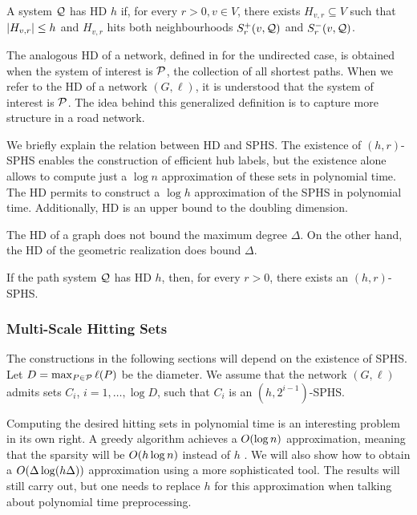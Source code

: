 \begin{definition}
A system $\mathcal{Q}$ has HD $h$ if, for every $r>0, v\in V$, there exists $H_{v,r}\subseteq V$ such that $\lvert H_{v,r}\rvert\leq h$ and $H_{v,r}$ hits both neighbourhoods $S_r^+(v,\mathcal{Q})$ and $S_r^-(v,\mathcal{Q})$.
\end{definition}

The analogous HD of a network, defined in \citet{highway2013} for the undirected case, is obtained when the system of interest is $\mathcal{P}$, the collection of all shortest paths.
When we refer to the HD of a network $(G,\ell)$, it is understood that the system of interest is $\mathcal{P}$.
The idea behind this generalized definition is to capture more structure in a road network.

We briefly explain the relation between HD and SPHS.
The existence of $(h,r)$-SPHS enables the construction of efficient hub labels, but the existence alone allows to compute just a $\log n$ approximation of these sets in polynomial time.
The HD permits to construct a $\log h$ approximation of the SPHS in polynomial time.
Additionally, HD is an upper bound to the doubling dimension.

The HD of a graph does not bound the maximum degree $\Delta$.
On the other hand, the HD of the geometric realization does bound $\Delta$.

\begin{proposition}
If the path system $\mathcal{Q}$ has HD $h$, then, for every $r>0$, there exists an $(h,r)$-SPHS.
\end{proposition}

\subsubsection{Multi-Scale Hitting Sets} \label{sec:multi_scale}
The constructions in the following sections will depend on the existence of SPHS.
Let $D=\max_{P\in\mathcal{P}}\ell(P)$ be the diameter.
We assume that the network $(G,\ell)$ admits sets $C_i$, $i=1,\ldots,\log D$, such that $C_i$ is an $(h,2^{i-1})$-SPHS.

Computing the desired hitting sets in polynomial time is an interesting problem in its own right.
A greedy algorithm achieves a $O(\log n)$ approximation, meaning that the sparsity will be $O(h\log n)$ instead of $h$ .
We will also show how to obtain a $O(\Delta\log(h\Delta))$ approximation using a more sophisticated tool.
The results will still carry out, but one needs to replace $h$ for this approximation when talking about polynomial time preprocessing.

